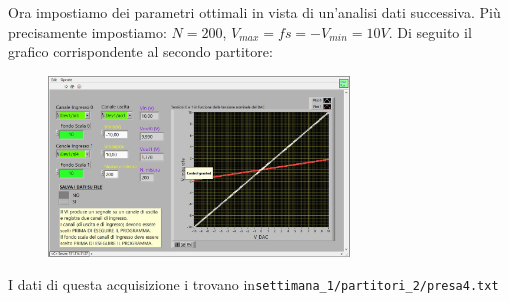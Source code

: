 Ora impostiamo dei parametri ottimali in vista di un'analisi dati successiva. Più precisamente impostiamo: $N = 200$, $V_{max} = fs = - V_{min} = 10 V$. Di seguito il grafico corrispondente al secondo partitore:
\begin{figure}[H]
\caption{}
    \includegraphics[width=8cm]{settimana_1/immagini/traccia_4.jpg}
    \centering
\end{figure}
I dati di questa acquisizione i trovano in\verb+settimana_1/partitori_2/presa4.txt+




